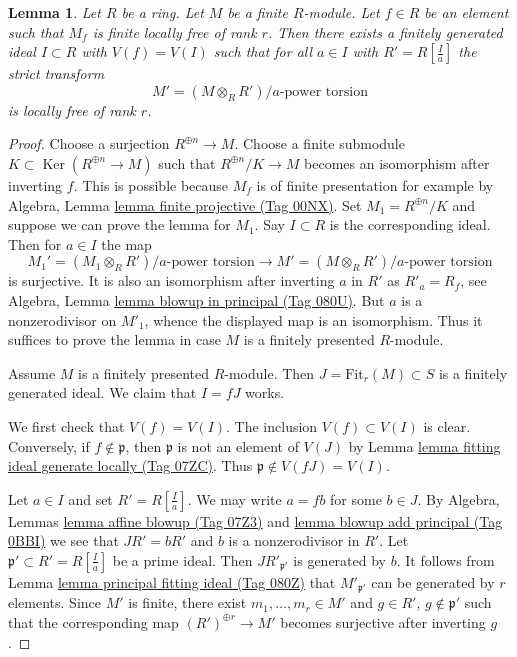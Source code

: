 \documentclass{amsart}
\theoremstyle{plain}
\newtheorem{lemma}[subsection]{Lemma}
\theoremstyle{definition}
\theoremstyle{remark}
\numberwithin{equation}{subsection}
\def\Ker{\mathop{\mathrm{Ker}}}
\begin{document}
\begin{lemma}
\label{lemma-blowup-module}
Let $R$ be a ring. Let $M$ be a finite $R$-module. Let $f \in R$
be an element such that $M_f$ is finite locally free of rank $r$.
Then there exists a finitely generated ideal $I \subset R$ with
$V(f) = V(I)$ such that for all $a \in I$ with $R' = R[\frac{I}{a}]$
the strict transform
$$
M' = (M \otimes_R R')/a\text{-power torsion}
$$
is locally free of rank $r$.
\end{lemma}

\begin{proof}
Choose a surjection $R^{\oplus n} \to M$. Choose a finite submodule
$K \subset \Ker(R^{\oplus n} \to M)$ such that $R^{\oplus n}/K \to M$
becomes an isomorphism after inverting $f$. This is possible because
$M_f$ is of finite presentation for example by
Algebra, Lemma \href{https://stacks.math.columbia.edu/tag/00NX}{lemma finite projective (Tag 00NX)}.
Set $M_1 = R^{\oplus n}/K$
and suppose we can prove the lemma for $M_1$. Say $I \subset R$ is the
corresponding ideal. Then for $a \in I$ the map
$$
M_1' = (M_1 \otimes_R R')/a\text{-power torsion}
\longrightarrow
M' = (M \otimes_R R')/a\text{-power torsion}
$$
is surjective. It is also an isomorphism after inverting $a$ in $R'$
as $R'_a = R_f$, see Algebra, Lemma \href{https://stacks.math.columbia.edu/tag/080U}{lemma blowup in principal (Tag 080U)}.
But $a$ is a nonzerodivisor on $M'_1$, whence the displayed map is an
isomorphism. Thus it suffices to prove the lemma in case $M$ is a finitely
presented $R$-module.

\medskip\noindent
Assume $M$ is a finitely presented $R$-module.
Then $J = \text{Fit}_r(M) \subset S$ is a finitely generated ideal.
We claim that $I = fJ$ works.

\medskip\noindent
We first check that $V(f) = V(I)$. The inclusion $V(f) \subset V(I)$ is
clear. Conversely, if $f \not \in \mathfrak p$, then
$\mathfrak p$ is not an element of $V(J)$ by 
Lemma \href{https://stacks.math.columbia.edu/tag/07ZC}{lemma fitting ideal generate locally (Tag 07ZC)}.
Thus $\mathfrak p \not \in V(fJ) = V(I)$.

\medskip\noindent
Let $a \in I$ and set $R' = R[\frac{I}{a}]$. We may write $a = fb$
for some $b \in J$. By Algebra, Lemmas \href{https://stacks.math.columbia.edu/tag/07Z3}{lemma affine blowup (Tag 07Z3)} and
\href{https://stacks.math.columbia.edu/tag/0BBI}{lemma blowup add principal (Tag 0BBI)} we see that $J R' = b R'$
and $b$ is a nonzerodivisor in $R'$. 
Let $\mathfrak p' \subset R' = R[\frac{I}{a}]$ be
a prime ideal. Then $JR'_{\mathfrak p'}$ is generated by $b$.
It follows from
Lemma \href{https://stacks.math.columbia.edu/tag/080Z}{lemma principal fitting ideal (Tag 080Z)}
that $M'_{\mathfrak p'}$ can be generated by $r$ elements.
Since $M'$ is finite, there exist $m_1, \ldots, m_r \in M'$ and
$g \in R'$, $g \not \in \mathfrak p'$ such that the corresponding map
$(R')^{\oplus r} \to M'$ becomes surjective after inverting $g$.


\end{proof}
\end{document}
